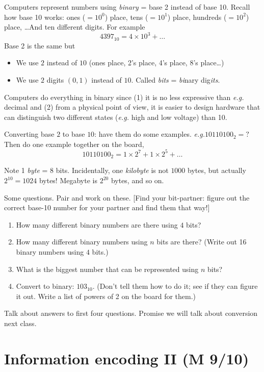 \documentclass{article}
\newcommand{\eg}{\emph{e.g.}\xspace}
\begin{document}
Computers represent numbers using \emph{binary} = base 2 instead of
base 10.  Recall how base 10 works: ones ($=10^0$) place, tens
($=10^1$) place, hundreds ($=10^2$) place, \dots  And ten different
digits.  For example \[ 4397_{10} = 4 \times 10^3 + \dots \] Base 2 is
the same but
\begin{itemize}
\item We use $2$ instead of $10$ (ones place, 2's place, 4's place,
  8's place\dots)
\item We use $2$ digits $(0,1)$ instead of $10$.  Called \emph{bits} =
  \emph{bi}nary dig\emph{its}.
\end{itemize}
Computers do everything in binary since (1) it is no less expressive
than \eg decimal and (2) from a physical point of view, it is easier
to design hardware that can distinguish two different states
(\eg high and low voltage) than 10.

Converting base $2$ to base $10$: have them do some
examples. \eg $10110100_2 = ?$  Then do one example together on the
board, \[ 10110100_2 = 1 \times 2^7 + 1 \times 2^5 + \dots \]

Note 1 \emph{byte} = 8 bits.  Incidentally, one \emph{kilobyte} is not
$1000$ bytes, but actually $2^{10} = 1024$ bytes!  Megabyte is
$2^{20}$ bytes, and so on.

Some questions.  Pair and work on these. [Find your bit-partner:
figure out the correct base-10 number for your partner and find them
that way!]

\begin{enumerate}
\item How many different binary numbers are there using $4$ bits?
\item How many different binary numbers using $n$ bits are there?
  (Write out 16 binary numbers using $4$ bits.)
\item What is the biggest number that can be represented using $n$
  bits?
\item Convert to binary: $103_{10}$. (Don't tell them how to do it;
  see if they can figure it out.  Write a list of powers of 2 on the
  board for them.)
\end{enumerate}

Talk about answers to first four questions.  Promise we will talk
about conversion next class.

\newpage
\section{Information encoding II (M 9/10)}
\end{document}
